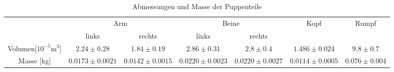 \begin{table}[p]
	\centering
	\begin{tabular}{ccccccc}
	\toprule
	&\multicolumn{2}{c}{Arm} & \multicolumn{2}{c}{Beine}  & {Kopf} & {Rumpf}\\
	&{links} &{rechts} &{links} &{rechts} &{} & {}\\
	\midrule
	Volumen[$10^{-5}\si{\meter\cubed}$]&$2.24 \pm0.28$ &$1.84 \pm0.19$&$2.86 \pm0.31 $&$2.8 \pm0.4 $&$1.486 \pm0.024$ &$9.8 \pm0.7$\\
	Masse [\si{\kilo\gram}] &$0.0173 \pm0.0021$&$0.0142 \pm0.0015$&$0.0220 \pm0.0023$&$0.0220 \pm0.0027$&$0.0114 \pm0.0005$&$0.076 \pm0.004$\\
	\bottomrule
	\end{tabular}
	\caption{Abmessungen und Masse der Puppenteile}
	\label{tab:M6 Puppenteile}	
\end{table}